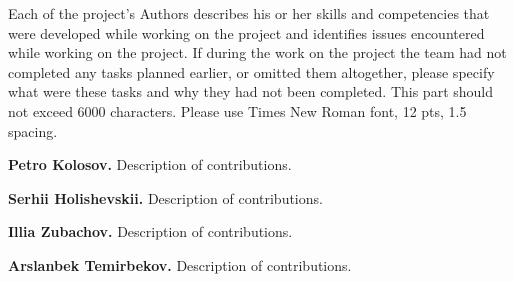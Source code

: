 Each of the project's Authors describes his or her skills and competencies that were developed while working on the
project and identifies issues encountered while working on the project.
If during the work on the project the team had not completed any tasks planned earlier, or omitted them altogether,
please specify what were these tasks and why they had not been completed.
This part should not exceed 6000 characters.
Please use Times New Roman font, 12 pts, 1.5 spacing.

\textbf{Petro Kolosov.} Description of contributions.

\textbf{Serhii Holishevskii.} Description of contributions.

\textbf{Illia Zubachov.} Description of contributions.

\textbf{Arslanbek Temirbekov.} Description of contributions.